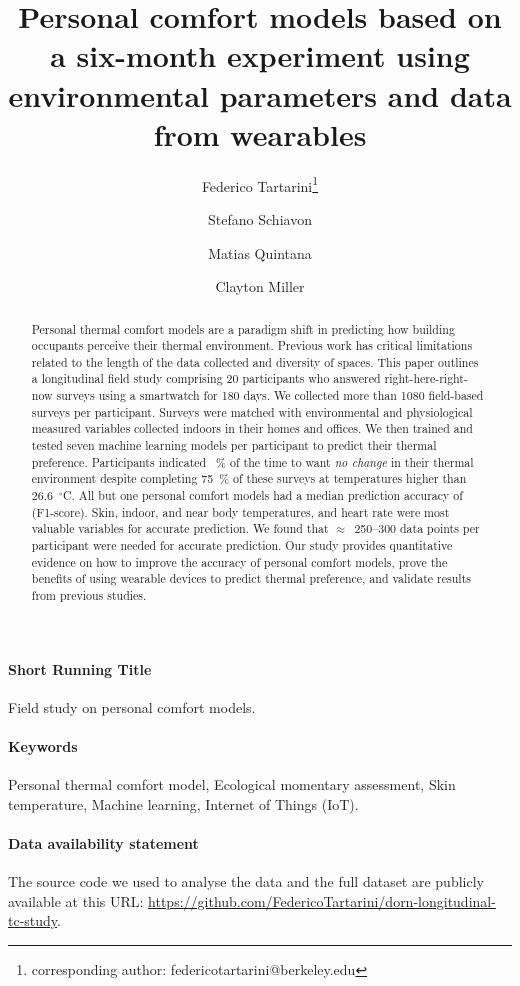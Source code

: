 \documentclass{article}
\title{Personal comfort models based on a six-month experiment using environmental parameters and data from wearables}
\author[a]{Federico Tartarini\thanks{corresponding author: federicotartarini@berkeley.edu}}
\author[b]{Stefano Schiavon}
\author[c]{Matias Quintana}
\author[c]{Clayton Miller}
\affil[a]{Berkeley Education Alliance for Research in Singapore, Singapore}
\affil[b]{Center for the Built Environment, University of California, Berkeley, CA, USA}
\affil[c]{Department of the Built Environment, National University of Singapore, Singapore}
\begin{document}
    \maketitle

    \begin{abstract}
        Personal thermal comfort models are a paradigm shift in predicting how building occupants perceive their thermal environment.
        Previous work has critical limitations related to the length of the data collected and diversity of spaces.
        This paper outlines a longitudinal field study comprising 20 participants who answered right-here-right-now surveys using a smartwatch for 180 days.
        We collected more than 1080 field-based surveys per participant.
        Surveys were matched with environmental and physiological measured variables collected indoors in their homes and offices.
        We then trained and tested seven machine learning models per participant to predict their thermal preference.
        Participants indicated ~\% of the time to want \emph{no change} in their thermal environment despite completing 75~\% of these surveys at temperatures higher than 26.6~$^{\circ}$C.
        All but one personal comfort models had a median prediction accuracy of  (F1-score).
        Skin, indoor, and near body temperatures, and heart rate were most valuable variables for accurate prediction.
        We found that $\approx$~250--300 data points per participant were needed for accurate prediction.
        Our study provides quantitative evidence on how to improve the accuracy of personal comfort models, prove the benefits of using wearable devices to predict thermal preference, and validate results from previous studies.
    \end{abstract}

    \paragraph{Short Running Title} Field study on personal comfort models.

    \paragraph{Keywords} Personal thermal comfort model, Ecological momentary assessment, Skin temperature, Machine learning, Internet of Things (IoT).

    \paragraph{Data availability statement} The source code we used to analyse the data and the full dataset are publicly available at this URL: \url{https://github.com/FedericoTartarini/dorn-longitudinal-tc-study}.
\end{document}
